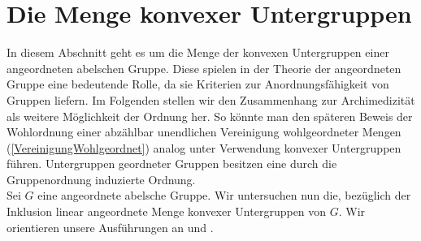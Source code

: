 \section{Die Menge konvexer Untergruppen}
In diesem Abschnitt geht es um die Menge der konvexen Untergruppen einer angeordneten abelschen Gruppe. Diese spielen in der Theorie der angeordneten Gruppe eine bedeutende Rolle, da sie Kriterien zur Anordnungsfähigkeit von Gruppen liefern. Im Folgenden stellen wir den Zusammenhang zur Archimedizität als weitere Möglichkeit der Ordnung her. So könnte man den späteren Beweis der Wohlordnung einer abzählbar unendlichen Vereinigung wohlgeordneter Mengen (\ref{VereinigungWohlgeordnet}) analog unter Verwendung konvexer Untergruppen führen.
 Untergruppen geordneter Gruppen besitzen eine durch die Gruppenordnung induzierte Ordnung. \\
% 
 
Sei $G$ eine angeordnete abelsche Gruppe.
Wir untersuchen nun die, bezüglich der Inklusion linear angeordnete Menge konvexer Untergruppen von $G$. Wir orientieren unsere Ausführungen an \cite[S. 81 - 83]{fuchs66}  und \cite[S. 3]{priesscrampe83}.

